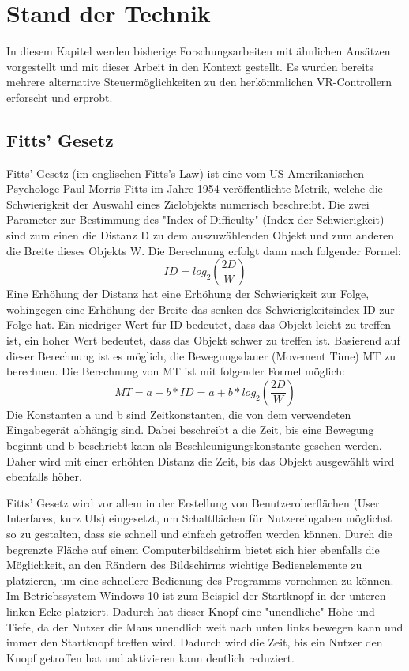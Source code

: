 
\chapter{Stand der Technik}
In diesem Kapitel werden bisherige Forschungsarbeiten mit ähnlichen Ansätzen vorgestellt und mit dieser Arbeit in den Kontext gestellt. Es wurden bereits mehrere alternative Steuermöglichkeiten zu den herkömmlichen VR-Controllern erforscht und erprobt. 
\section{Fitts' Gesetz}
Fitts' Gesetz (im englischen Fitts's Law) ist eine vom US-Amerikanischen Psychologe Paul Morris Fitts im Jahre 1954 veröffentlichte Metrik, welche die Schwierigkeit der Auswahl eines Zielobjekts numerisch beschreibt. Die zwei Parameter zur Bestimmung des "Index of Difficulty" (Index der Schwierigkeit) sind zum einen die Distanz D zu dem auszuwählenden Objekt und zum anderen die Breite dieses Objekts W. Die Berechnung erfolgt dann nach folgender Formel:
\begin{equation}
ID = log_2 \left ( \frac{2D}{W} \right )
\end{equation}
Eine Erhöhung der Distanz hat eine Erhöhung der Schwierigkeit zur Folge, wohingegen eine Erhöhung der Breite das senken des Schwierigkeitsindex ID zur Folge hat. Ein niedriger Wert für ID bedeutet, dass das Objekt leicht zu treffen ist, ein hoher Wert bedeutet, dass das Objekt schwer zu treffen ist. 
Basierend auf dieser Berechnung ist es möglich, die Bewegungsdauer (Movement Time) MT zu berechnen. Die Berechnung von MT ist mit folgender Formel möglich:
\begin{equation}
MT = a + b * ID = a + b * log_2 \left ( \frac{2D}{W} \right )
\end{equation}
Die Konstanten a und b sind Zeitkonstanten, die von dem verwendeten Eingabegerät abhängig sind. Dabei beschreibt a die Zeit, bis eine Bewegung beginnt und b beschriebt kann als Beschleunigungskonstante gesehen werden. Daher wird mit einer erhöhten Distanz die Zeit, bis das Objekt ausgewählt wird ebenfalls höher.

Fitts' Gesetz wird vor allem in der Erstellung von Benutzeroberflächen (User Interfaces, kurz UIs) eingesetzt, um Schaltflächen für Nutzereingaben möglichst so zu gestalten, dass sie schnell und einfach getroffen werden können. Durch die begrenzte Fläche auf einem Computerbildschirm bietet sich hier ebenfalls die Möglichkeit, an den Rändern des Bildschirms wichtige Bedienelemente zu platzieren, um eine schnellere Bedienung des Programms vornehmen zu können. Im Betriebssystem Windows 10 ist zum Beispiel der Startknopf in der unteren linken Ecke platziert. Dadurch hat dieser Knopf eine "unendliche" Höhe und Tiefe, da der Nutzer die Maus unendlich weit nach unten links bewegen kann und immer den Startknopf treffen wird. Dadurch wird die Zeit, bis ein Nutzer den Knopf getroffen hat und aktivieren kann deutlich reduziert.

